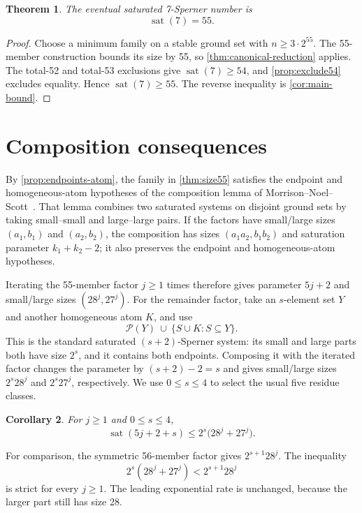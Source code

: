 \documentclass[11pt]{article}
\newtheorem{theorem}{Theorem}[section]
\newtheorem{corollary}[theorem]{Corollary}
\theoremstyle{definition}
\theoremstyle{remark}
\newcommand{\powerset}{\mathcal{P}}
\newcommand{\sat}{\operatorname{sat}}
\begin{document}
\begin{theorem}
\label{thm:sat7}
The eventual saturated 7-Sperner number is
\[
  \sat(7)=55.
\]
\end{theorem}

\begin{proof}
Choose a minimum family on a stable ground set with
$n\geq3\cdot2^{55}$.  The 55-member construction bounds its size by 55, so
\cref{thm:canonical-reduction} applies.  The total-52 and total-53 exclusions
give $\sat(7)\geq54$, and
\cref{prop:exclude54} excludes equality.  Hence $\sat(7)\geq55$.
The reverse inequality is \cref{cor:main-bound}.
\end{proof}

\section{Composition consequences}
\label{sec:composition}

By \cref{prop:endpoints-atom}, the family in \cref{thm:size55} satisfies the
endpoint and homogeneous-atom hypotheses of the composition lemma of
Morrison--Noel--Scott~\cite[Lemma~18]{mns2014}.  That lemma combines two saturated
systems on disjoint ground sets by taking small--small and large--large
pairs.  If the factors have small/large sizes $(a_1,b_1)$ and $(a_2,b_2)$,
the composition has sizes $(a_1a_2,b_1b_2)$ and saturation parameter
$k_1+k_2-2$; it also preserves the endpoint and homogeneous-atom hypotheses.

Iterating the 55-member factor $j\geq1$ times therefore gives parameter
$5j+2$ and small/large sizes $(28^j,27^j)$.  For the remainder factor, take
an $s$-element set $Y$ and another homogeneous atom $K$, and use
\[
  \powerset(Y)\ \cup\ \{S\cup K:S\subseteq Y\}.
\]
This is the standard saturated $(s+2)$-Sperner system: its small and large
parts both have size $2^s$, and it contains both endpoints.  Composing it with
the iterated factor changes the parameter by
$(s+2)-2=s$ and gives small/large sizes
$2^s28^j$ and $2^s27^j$, respectively.  We use $0\leq s\leq4$ to select the
usual five residue classes.

\begin{corollary}
\label{cor:discrete-bound}
For $j\geq1$ and $0\leq s\leq4$,
\[
  \sat(5j+2+s)\leq 2^s\bigl(28^j+27^j\bigr).
\]
\end{corollary}

For comparison, the symmetric 56-member factor gives
$2^{s+1}28^j$.  The inequality
\[
  2^s(28^j+27^j)<2^{s+1}28^j
\]
is strict for every $j\geq1$.  The leading exponential rate is unchanged,
because the larger part still has size 28.
\end{document}
